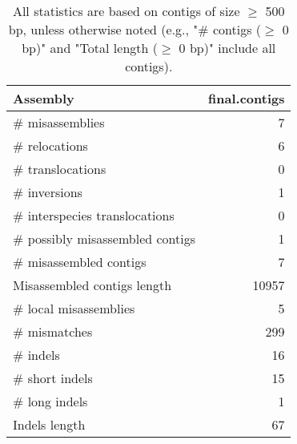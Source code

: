 \documentclass[12pt,a4paper]{article}
\begin{document}
\begin{table}[ht]
\begin{center}
\caption{All statistics are based on contigs of size $\geq$ 500 bp, unless otherwise noted (e.g., "\# contigs ($\geq$ 0 bp)" and "Total length ($\geq$ 0 bp)" include all contigs).}
\begin{tabular}{|l*{1}{|r}|}
\hline
Assembly & final.contigs \\ \hline
\# misassemblies & 7 \\ \hline
\hspace{5mm}\# relocations & 6 \\ \hline
\hspace{5mm}\# translocations & 0 \\ \hline
\hspace{5mm}\# inversions & 1 \\ \hline
\hspace{5mm}\# interspecies translocations & 0 \\ \hline
\# possibly misassembled contigs & 1 \\ \hline
\# misassembled contigs & 7 \\ \hline
Misassembled contigs length & 10957 \\ \hline
\# local misassemblies & 5 \\ \hline
\# mismatches & 299 \\ \hline
\# indels & 16 \\ \hline
\hspace{5mm}\# short indels & 15 \\ \hline
\hspace{5mm}\# long indels & 1 \\ \hline
Indels length & 67 \\ \hline
\end{tabular}
\end{center}
\end{table}
\end{document}
